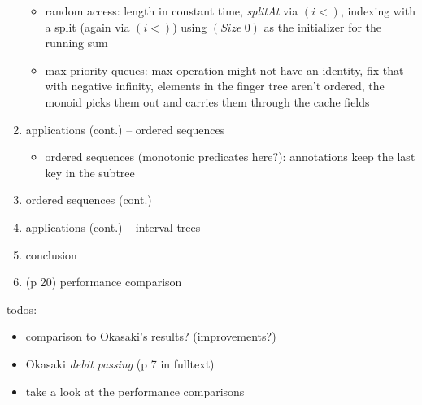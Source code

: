 \documentclass[a4paper]{article}
\begin{document}
\begin{enumerate}[nosep]
\begin{itemize}
			\item random access: length in constant time, \textit{splitAt} via
				$(i <)$, indexing with a split (again via $(i <)$) using
				$(Size~0)$ as the initializer for the running sum
			\item max-priority queues: max operation might not have an
				identity, fix that with negative infinity, elements in the
				finger tree aren't ordered, the monoid picks them out and
				carries them through the cache fields
		\end{itemize}
	\item applications (cont.) -- ordered sequences
		\begin{itemize}
			\item ordered sequences (monotonic predicates here?): annotations
				keep the last key in the subtree
		\end{itemize}
	\item ordered sequences (cont.)
	\item applications (cont.) -- interval trees
	\item conclusion
	\item (p 20) performance comparison
\end{enumerate}

todos:
\begin{itemize}
	\item comparison to Okasaki's results? (improvements?)
	\item Okasaki \textit{debit passing} (p 7 in fulltext)
	\item take a look at the performance comparisons
\end{itemize}
\end{document}

